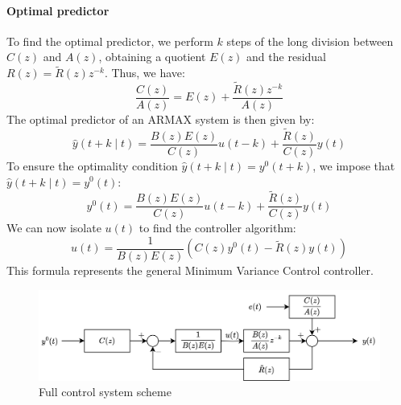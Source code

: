\paragraph*{Optimal predictor}
To find the optimal predictor, we perform $k$ steps of the long division between $C(z)$ and $A(z)$, obtaining a quotient $E(z)$ and the residual $R(z)=\tilde{R}(z)z^{-k}$. 
Thus, we have:
\[\dfrac{C(z)}{A(z)}=E(z)+\dfrac{\tilde{R}(z)z^{-k}}{A(z)}\]
The optimal predictor of an ARMAX system is then given by:
\[\hat{y}(t+k\mid t)=\dfrac{B(z)E(z)}{C(z)}u(t-k)+\dfrac{\tilde{R}(z)}{C(z)}y(t)\]
To ensure the optimality condition $\hat{y}(t+k\mid t)=y^{0}(t+k)$, we impose that $\hat{y}(t+k\mid t)=y^{0}(t)$: 
\[y^{0}(t)=\dfrac{B(z)E(z)}{C(z)}u(t-k)+\dfrac{\tilde{R}(z)}{C(z)}y(t)\]
We can now isolate $u(t)$ to find the controller algorithm: 
\[u(t)=\dfrac{1}{B(z)E(z)}\left(C(z)y^{0}(t)-\tilde{R}(z)y(t)\right)\]
This formula represents the general Minimum Variance Control controller.
\begin{figure}[H]
    \centering
    \includegraphics[width=0.75\linewidth]{images/fcss.png}
    \caption{Full control system scheme}
\end{figure}